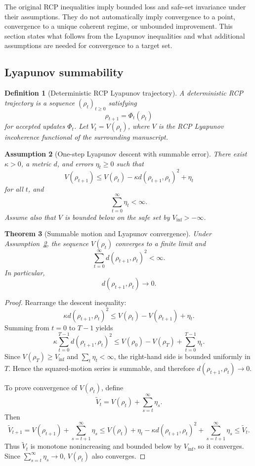 \documentclass[11pt]{article}
\newtheorem{theorem}{Theorem}[section]
\newtheorem{definition}[theorem]{Definition}
\newtheorem{assumption}[theorem]{Assumption}
\newcommand{\1}{\mathbf{1}}
\begin{document}
The original RCP inequalities imply bounded loss and safe-set invariance under their assumptions.  They do not automatically imply convergence to a point, convergence to a unique coherent regime, or unbounded improvement.  This section states what follows from the Lyapunov inequalities and what additional assumptions are needed for convergence to a target set.

\subsection{Lyapunov summability}

\begin{definition}[Deterministic RCP Lyapunov trajectory]
\label{def:deterministic_rcp_lyapunov_trajectory}
A deterministic RCP trajectory is a sequence \((\rho_t)_{t\ge0}\) satisfying
\[
\rho_{t+1}=\Phi_t(\rho_t)
\]
for accepted updates \(\Phi_t\).  Let \(V_t=V(\rho_t)\), where \(V\) is the RCP Lyapunov incoherence functional of the surrounding manuscript.
\end{definition}

\begin{assumption}[One-step Lyapunov descent with summable error]
\label{ass:lyapunov_descent_summable_error_DG}
There exist \(\kappa>0\), a metric \(d\), and errors \(\eta_t\ge0\) such that
\[
V(\rho_{t+1})
\le
V(\rho_t)-\kappa d(\rho_{t+1},\rho_t)^2+\eta_t
\]
for all \(t\), and
\[
\sum_{t=0}^{\infty}\eta_t<\infty.
\]
Assume also that \(V\) is bounded below on the safe set by \(V_{\inf}>-\infty\).
\end{assumption}

\begin{theorem}[Summable motion and Lyapunov convergence]
\label{thm:summable_motion_lyapunov_convergence}
Under Assumption~\ref{ass:lyapunov_descent_summable_error_DG}, the sequence \(V(\rho_t)\) converges to a finite limit and
\[
\sum_{t=0}^{\infty}d(\rho_{t+1},\rho_t)^2<\infty.
\]
In particular,
\[
d(\rho_{t+1},\rho_t)\to0.
\]
\end{theorem}

\begin{proof}
Rearrange the descent inequality:
\[
\kappa d(\rho_{t+1},\rho_t)^2
\le
V(\rho_t)-V(\rho_{t+1})+\eta_t.
\]
Summing from \(t=0\) to \(T-1\) yields
\[
\kappa\sum_{t=0}^{T-1}d(\rho_{t+1},\rho_t)^2
\le
V(\rho_0)-V(\rho_T)+\sum_{t=0}^{T-1}\eta_t.
\]
Since \(V(\rho_T)\ge V_{\inf}\) and \(\sum_t\eta_t<\infty\), the right-hand side is bounded uniformly in \(T\).  Hence the squared-motion series is summable, and therefore \(d(\rho_{t+1},\rho_t)\to0\).

To prove convergence of \(V(\rho_t)\), define
\[
\widetilde V_t=V(\rho_t)+\sum_{s=t}^{\infty}\eta_s.
\]
Then
\[
\widetilde V_{t+1}
=
V(\rho_{t+1})+\sum_{s=t+1}^{\infty}\eta_s
\le
V(\rho_t)+\eta_t-\kappa d(\rho_{t+1},\rho_t)^2+\sum_{s=t+1}^{\infty}\eta_s
\le
\widetilde V_t.
\]
Thus \(\widetilde V_t\) is monotone nonincreasing and bounded below by \(V_{\inf}\), so it converges.  Since \(\sum_{s=t}^{\infty}\eta_s\to0\), \(V(\rho_t)\) also converges.
\end{proof}
\end{document}
